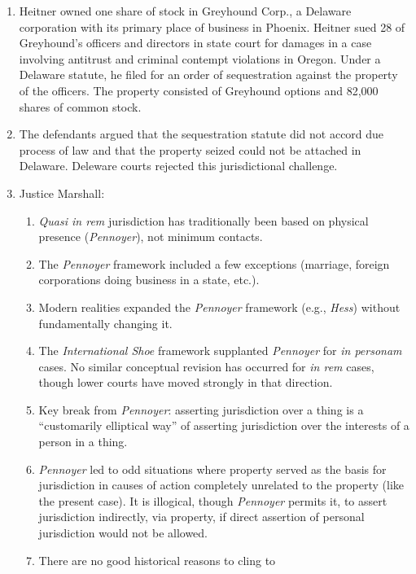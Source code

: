 \begin{enumerate}
    \item Heitner owned one share of stock in Greyhound Corp., a
    Delaware corporation with its primary place of business in Phoenix.
    Heitner sued 28 of Greyhound's officers and directors in state court for 
    damages in a case involving antitrust and criminal contempt violations in 
    Oregon. Under a Delaware statute, he filed for an order of sequestration 
    against
    the property of the officers. The property consisted of Greyhound
    options and 82,000 shares of common stock.
    \item The defendants argued that the sequestration statute did not accord 
    due
    process of law and that the property seized could not be attached in
    Delaware. Deleware courts rejected this jurisdictional challenge.
    \item Justice Marshall:
    \begin{enumerate}
        \item \emph{Quasi in rem} jurisdiction has traditionally been based on 
        physical presence (\emph{Pennoyer}), not minimum contacts.
        \item The \emph{Pennoyer} framework included a few exceptions 
        (marriage, foreign corporations doing business in a state, etc.).
        \item Modern realities expanded the \emph{Pennoyer} framework (e.g., 
        \emph{Hess}) without fundamentally changing it.
        \item The \emph{International Shoe} framework supplanted 
        \emph{Pennoyer} for \emph{in personam} cases. No similar conceptual 
        revision has occurred for \emph{in rem} cases, though lower courts 
        have moved strongly in that direction.
        \item Key break from \emph{Pennoyer}: asserting jurisdiction over a 
        thing is a ``customarily elliptical way'' of asserting jurisdiction 
        over the interests of a person in a thing.
        \item \emph{Pennoyer} led to odd situations where property served as 
        the basis for jurisdiction in causes of action completely unrelated to 
        the property (like the present case). It is illogical, though 
        \emph{Pennoyer} permits it, to assert jurisdiction indirectly, via 
        property, if direct assertion of personal jurisdiction would not be 
        allowed.
        \item There are no good historical reasons to cling to 

\end{enumerate}
\end{enumerate}
